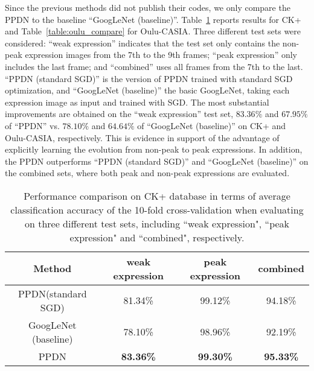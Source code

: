 \documentclass[runningheads]{llncs}
\begin{document}
Since the previous methods did not publish their codes, we only compare 
the PPDN to the baseline ``GoogLeNet (baseline)''.
Table~\ref{table:ck_compare} reports results for CK+ and 
Table~\ref{table:oulu_compare} for Oulu-CASIA. Three different test sets
were considered: ``weak expression'' indicates that the test set only 
contains the non-peak expression images from the 7th to the 9th frames;
``peak expression'' only includes the last frame; and ``combined'' 
uses all frames from the 7th to the last. ``PPDN (standard SGD)'' is the 
version of PPDN trained with standard SGD optimization, and 
``GoogLeNet (baseline)'' the basic GoogLeNet, taking each expression image 
as input and trained with SGD. The most substantial improvements 
are obtained on the ``weak expression'' test set, $83.36\%$ and
$67.95\%$ of ``PPDN'' vs. $78.10\%$ and $64.64\%$ of ``GoogLeNet (baseline)''
on CK+ and Oulu-CASIA, respectively. This is evidence in support
of the advantage of explicitly learning the evolution from non-peak 
to peak expressions. In addition, the PPDN outperforms ``PPDN (standard SGD)''
and ``GoogLeNet (baseline)'' on the combined sets, where both peak and 
non-peak expressions are evaluated. 

\begin{table}[!tp]\setlength{\tabcolsep}{0.5pt}
	\begin{center}
		\caption{Performance comparison on CK+ database in terms of average classification accuracy of the 10-fold cross-validation when evaluating on three different test sets, including ``weak expression", ``peak expression" and ``combined", respectively.}
		\label{table:ck_compare}
		\begin{tabular}{c|c|c|c}
			\hline\noalign{\smallskip}
			Method & weak expression & peak expression & combined\\
			\hline
			PPDN(standard SGD) & 81.34\% & 99.12\% & 94.18\%\\
			GoogLeNet (baseline)   & 78.10\% & 98.96\% & 92.19\%\\
			\hline
			PPDN & \textbf{83.36\%} & \textbf{99.30\%} & \textbf{95.33\%}\\
			\hline
		\end{tabular}
	\end{center}
\end{table}
\end{document}
